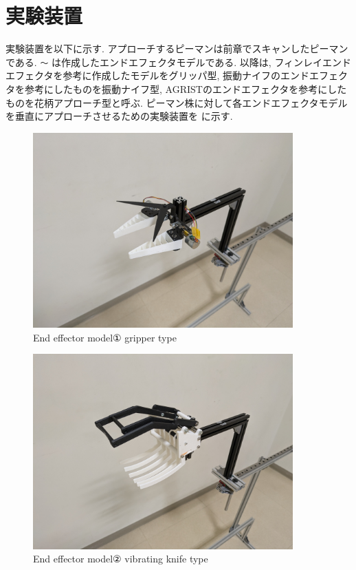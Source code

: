 \section{実験装置}
実験装置を以下に示す.
アプローチするピーマンは前章でスキャンしたピーマンである.
 \verb|〜|  は作成したエンドエフェクタモデルである.
以降は, フィンレイエンドエフェクタを参考に作成したモデルをグリッパ型, 振動ナイフのエンドエフェクタを参考にしたものを振動ナイフ型, AGRISTのエンドエフェクタを参考にしたものを花柄アプローチ型と呼ぶ.
ピーマン株に対して各エンドエフェクタモデルを垂直にアプローチさせるための実験装置を  に示す.


\vspace{5mm}
\begin{figure}[H]
     \centering
     \includegraphics[width=100mm]{images/png/finray_model.png}
     \caption{End effector model① gripper type}
     \label{Fig:finraymodel}
   \end{figure}

\begin{figure}[H]
    \centering
    \includegraphics[width=100mm]{images/png/sweeper_model.png}
    \caption{End effector model② vibrating knife type}
    \label{Fig:sweepermodel}
   \end{figure}

